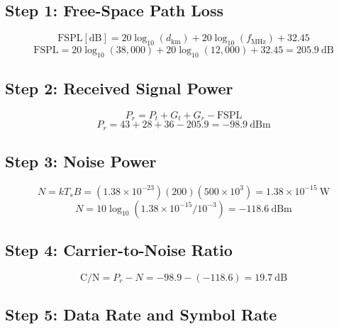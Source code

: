 \subsection*{Step 1: Free-Space Path Loss}

\begin{equation}
\mathrm{FSPL}[\mathrm{dB}] = 20\log_{10}(d_{\mathrm{km}}) + 20\log_{10}(f_{\mathrm{MHz}}) + 32.45
\end{equation}
\begin{equation}
\mathrm{FSPL} = 20\log_{10}(38{,}000) + 20\log_{10}(12{,}000) + 32.45 = 205.9~\mathrm{dB}
\end{equation}

\subsection*{Step 2: Received Signal Power}

\begin{equation}
P_r = P_t + G_t + G_r - \mathrm{FSPL}
\end{equation}
\begin{equation}
P_r = 43 + 28 + 36 - 205.9 = -98.9~\mathrm{dBm}
\end{equation}

\subsection*{Step 3: Noise Power}

\begin{equation}
N = kT_sB = (1.38 \times 10^{-23})(200)(500 \times 10^3) = 1.38 \times 10^{-15}~\mathrm{W}
\end{equation}
\begin{equation}
N = 10\log_{10}(1.38 \times 10^{-15}/10^{-3}) = -118.6~\mathrm{dBm}
\end{equation}

\subsection*{Step 4: Carrier-to-Noise Ratio}

\begin{equation}
\mathrm{C/N} = P_r - N = -98.9 - (-118.6) = 19.7~\mathrm{dB}
\end{equation}

\subsection*{Step 5: Data Rate and Symbol Rate}

